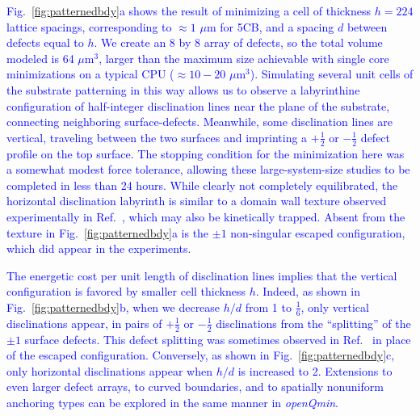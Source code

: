 \documentclass[utf8]{frontiersFPHY} %
\newcommand{\DAB}[1]{\textcolor{blue}{#1}}
\newcommand{\DMS}[1]{\textcolor{blue}{#1}}
\def\PackageName{\textit{openQmin}}
\begin{document}
\DAB{Fig.~\ref{fig:patternedbdy}a shows the result} \DMS{of minimizing a cell of thickness $h =224$ lattice spacings,} \DAB{ corresponding to $\approx 1$ $\mu$m for 5CB,  and a spacing $d$ between defects equal to $h$.} \DMS{ We create an 8 by 8 array of defects,} \DAB{ so the total volume modeled is 64 $\mu$m$^3$, larger than the maximum size achievable with single core minimizations on a typical CPU ($\approx 10-20$ $\mu$m$^3$). Simulating several unit cells of the substrate patterning in this way allows us to observe a labyrinthine configuration of half-integer disclination lines near the plane of the substrate, connecting neighboring surface-defects. Meanwhile, some disclination lines are vertical, traveling between the two surfaces and imprinting a $+\frac{1}{2}$ or $-\frac{1}{2}$  defect profile on the top surface. } \DMS{The stopping condition for the minimization here was a somewhat modest force tolerance, allowing these large-system-size studies to be completed in less than 24 hours. } \DAB{While clearly not completely equilibrated, the horizontal disclination labyrinth is similar to a domain wall texture observed experimentally  in Ref.~\cite{murray2014creating}, which may also be kinetically trapped. Absent from the texture in Fig.~\ref{fig:patternedbdy}a is the $\pm 1$ non-singular escaped configuration, which did appear in the experiments.}

\DAB{The energetic cost per unit length of disclination lines implies that the vertical configuration is favored by smaller cell thickness $h$. Indeed, }\DMS{as shown in Fig.~\ref{fig:patternedbdy}b, } \DAB{when we decrease $h/d$ from 1 to $\frac{1}{6}$, only vertical disclinations appear, in pairs of $+\frac{1}{2}$ or $-\frac{1}{2}$ disclinations from the ``splitting'' of the $\pm 1$ surface defects. This defect splitting was  sometimes observed in Ref.~\cite{murray2014creating} in place of the escaped configuration. Conversely, as shown in Fig.~\ref{fig:patternedbdy}c, only horizontal disclinations appear when $h/d$ is increased to 2. Extensions to even larger defect arrays, to curved boundaries, and to spatially nonuniform anchoring types can be explored in the same manner in \PackageName.   }
\end{document}

